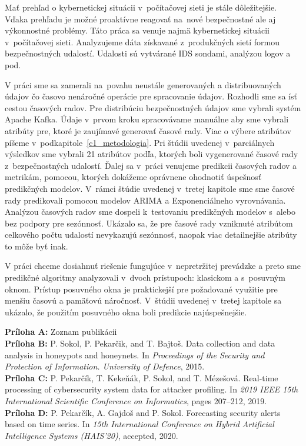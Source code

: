 \documentclass[thesismargins, thesislinespacing, openright, upjsfrontpage]{rnthesis}
\begin{document}

\zaver

Mať prehľad o kybernetickej situácii v~počítačovej sieti je stále dôležitejšie. Vďaka prehľadu je možné proaktívne reagovať na~nové bezpečnostné ale aj výkonnostné problémy. Táto práca sa venuje najmä kybernetickej situácii v~počítačovej sieti. Analyzujeme dáta získavané z~produkčných sietí formou bezpečnostných udalostí. Udalosti sú vytvárané IDS sondami, analýzou logov a pod. 

V práci sme sa zamerali na~povahu neustále generovaných a distribuovaných údajov čo časovo nenáročné operácie pre spracovanie údajov. Rozhodli sme sa ísť cestou časových radov. Pre distribúciu bezpečnostných údajov sme vybrali systém Apache Kafka. Údaje v~prvom kroku spracovávame manuálne aby sme vybrali atribúty pre, ktoré je zaujímavé generovať časové rady. Viac o výbere atribútov píšeme v~podkapitole~\ref{c1_metodologia}. Pri štúdii uvedenej v~parciálnych výsledkov sme vybrali 21 atribútov podľa, ktorých boli vygenerované časové rady z~bezpečnostných udalostí. Ďalej sa v~práci venujeme predikcii časových radov a metrikám, pomocou, ktorých dokážeme oprávnene ohodnotiť úspešnosť predikčných modelov. V~rámci štúdie uvedenej v~tretej kapitole sme sme časové rady predikovali pomocou modelov ARIMA a Exponenciálneho vyrovnávania. Analýzou časových radov sme dospeli k~testovaniu predikčných modelov s~alebo bez podpory pre sezónnosť. Ukázalo sa, že pre časové rady vzniknuté atribútom celkového počtu udalostí nevykazujú sezónnosť, naopak viac detailnejšie atribúty to môže byť inak.

V práci chceme dosiahnuť riešenie fungujúce v~nepretržitej prevádzke a preto sme predikčné algoritmy analyzovali v~dvoch prístupoch: klasickom a s~posuvným oknom. Prístup posuvného okna je praktickejší pre požadované využitie pre menšiu časovú a pamäťovú náročnosť. V~štúdii uvedenej v~tretej kapitole sa ukázalo, že použitím posuvného okna boli predikcie najúspešnejšie.

%
%
\prilohy

\textbf{Príloha A:} Zoznam publikácii \\
\textbf{Príloha B:} P. Sokol, P. Pekarčik, and T. Bajtoš. Data collection and data analysis in honeypots and honeynets. In \textit{Proceedings of the Security and Protection of Information. University of Defence}, 2015. \\
\textbf{Príloha C:} P. Pekarčík, T. Kekeňák, P. Sokol, and T. Mézešová. Real-time processing of cybersecurity system data for attacker profiling. In \textit{2019 IEEE 15th International Scientific Conference on Informatics}, pages 207–212, 2019. \\
\textbf{Príloha D:} P. Pekarčík, A. Gajdoš and P. Sokol. Forecasting security alerts based on time series. In \textit{15th International Conference on Hybrid Artificial Intelligence Systems (HAIS’20)}, accepted, 2020.
\end{document}
